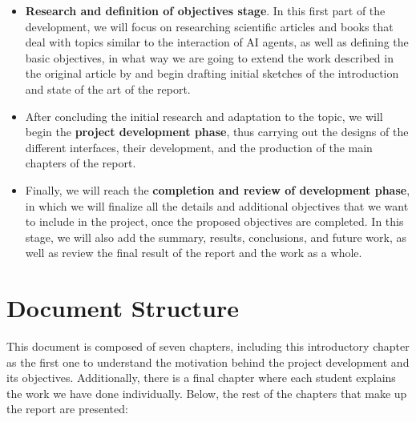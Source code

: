 \begin{itemize}
	
	\item \textbf{Research and definition of objectives stage}. In this first part of the development, we will focus on researching scientific articles and books that deal with topics similar to the interaction of AI agents, as well as defining the basic objectives, in what way we are going to extend the work described in the original article by \ga and begin drafting initial sketches of the introduction and state of the art of the report.
	
	\item After concluding the initial research and adaptation to the topic, we will begin the \textbf{project development phase}, thus carrying out the designs of the different interfaces, their development, and the production of the main chapters of the report.
	
	\item Finally, we will reach the \textbf{completion and review of development phase}, in which we will finalize all the details and additional objectives that we want to include in the project, once the proposed objectives are completed. In this stage, we will also add the summary, results, conclusions, and future work, as well as review the final result of the report and the work as a whole.
	
\end{itemize}



\section{Document Structure}
This document is composed of seven chapters, including this introductory chapter as the first one to understand the motivation behind the project development and its objectives. Additionally, there is a final chapter where each student explains the work we have done individually. Below, the rest of the chapters that make up the report are presented:

